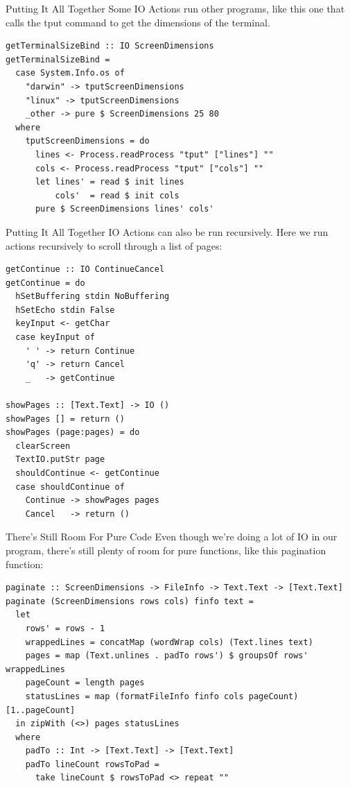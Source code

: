 \documentclass[10pt, presentation, colorlinks]{beamer}
\begin{document}
\begin{frame}[label={sec:org8073551},fragile]{Putting It All Together}
 Some IO Actions run other programs, like this one that calls the
\alert{tput} command to get the dimensions of the terminal.

\begin{verbatim}
getTerminalSizeBind :: IO ScreenDimensions
getTerminalSizeBind =
  case System.Info.os of
    "darwin" -> tputScreenDimensions
    "linux" -> tputScreenDimensions
    _other -> pure $ ScreenDimensions 25 80
  where
    tputScreenDimensions = do
      lines <- Process.readProcess "tput" ["lines"] ""
      cols <- Process.readProcess "tput" ["cols"] ""
      let lines' = read $ init lines
          cols'  = read $ init cols
      pure $ ScreenDimensions lines' cols'
\end{verbatim}
\end{frame}

\begin{frame}[label={sec:org5e09507},fragile]{Putting It All Together}
 IO Actions can also be run recursively. Here we run actions
recursively to scroll through a list of pages:

\begin{verbatim}
getContinue :: IO ContinueCancel
getContinue = do
  hSetBuffering stdin NoBuffering
  hSetEcho stdin False
  keyInput <- getChar
  case keyInput of
    ' ' -> return Continue
    'q' -> return Cancel
    _   -> getContinue

showPages :: [Text.Text] -> IO ()
showPages [] = return ()
showPages (page:pages) = do
  clearScreen
  TextIO.putStr page
  shouldContinue <- getContinue
  case shouldContinue of
    Continue -> showPages pages
    Cancel   -> return ()
\end{verbatim}
\end{frame}

\begin{frame}[label={sec:org12d3e9d},fragile]{There's Still Room For Pure Code}
 Even though we're doing a lot of IO in our program, there's still
plenty of room for pure functions, like this pagination function:

\bigskip

\begin{verbatim}
paginate :: ScreenDimensions -> FileInfo -> Text.Text -> [Text.Text]
paginate (ScreenDimensions rows cols) finfo text =
  let
    rows' = rows - 1
    wrappedLines = concatMap (wordWrap cols) (Text.lines text)
    pages = map (Text.unlines . padTo rows') $ groupsOf rows' wrappedLines
    pageCount = length pages
    statusLines = map (formatFileInfo finfo cols pageCount) [1..pageCount]
  in zipWith (<>) pages statusLines
  where
    padTo :: Int -> [Text.Text] -> [Text.Text]
    padTo lineCount rowsToPad =
      take lineCount $ rowsToPad <> repeat ""
\end{verbatim}
\end{frame}
\end{document}
